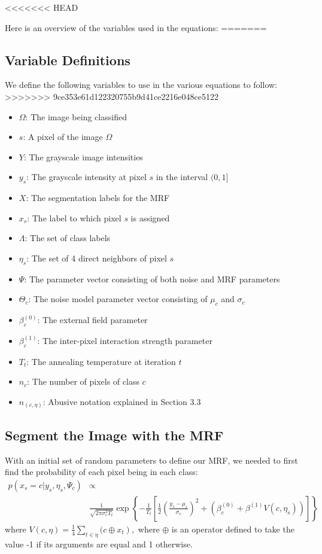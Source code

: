 \documentclass[11pt]{article}
\begin{document}
<<<<<<< HEAD

Here is an overview of the variables used in the equations:
=======
\subsection{Variable Definitions}
We define the following variables to use in the various equations to follow:
>>>>>>> 9ce353e61d122320755b9d41ce2216e048ce5122

\begin{itemize}
	\item $\Omega$: The image being classified
	\item $s$: A pixel of the image $\Omega$
	\item $Y$: The grayscale image intensities
	\item $y_{s}$: The grayscale intensity at pixel $s$ in the interval $(0,1]$
	\item $X$: The segmentation labels for the MRF
	\item $x_{s}$: The label to which pixel $s$ is assigned
	\item $\Lambda$: The set of class labels
	\item $\eta_{s}$: The set of 4 direct neighbors of pixel $s$
	\item $\Psi$: The parameter vector consisting of both noise and MRF parameters
	\item $\Theta_{c}$: The noise model parameter vector consisting of $\mu_{c}$ and $\sigma_{c}$
	\item $\beta_{c}^{(0)}$: The external field parameter
	\item $\beta_{c}^{(1)}$: The inter-pixel interaction strength parameter
	\item $T_{t}$: The annealing temperature at iteration $t$
	\item $n_{c}$: The number of pixels of class $c$
	\item $n_{(c, \eta)}$: Abusive notation explained in Section 3.3
\end{itemize}



\subsection{Segment the Image with the MRF}
With an initial set of random parameters to define our MRF, we needed to first find the probability of each pixel being in each class:
\begin{equation}
\begin{aligned}
p\left(x_{s} = c | y_{s}, \eta_{s}, \Psi_{c}\right) & \propto \\
&\frac{1}{\sqrt{2 \pi \sigma_{c}^{2} T_{t}}} \exp \left\{ -\frac{1}{T_{t}} \left[\frac{1}{2} \left(\frac{y_{s}-\mu_{c}}{\sigma_{c}}\right)^{2} + \left( \beta_{c}^{(0)} + \beta^{(1)} V(c, \eta_{s}) \right) \right] \right\}
\end{aligned}
\end{equation}
where $V(c, \eta)=\frac{1}{4} \sum_{t \in \eta}(c \oplus\left.x_{t}\right),$ where $\oplus$ is an operator defined to take the value -1 if its arguments are equal and 1 otherwise.
\end{document}
